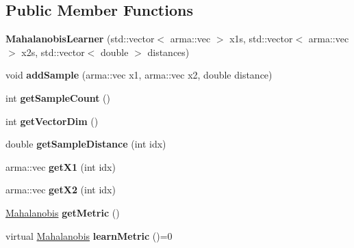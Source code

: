 \subsection*{Public Member Functions}
\begin{DoxyCompactItemize}
\item 
\hypertarget{classkukadu_1_1MahalanobisLearner_a9f9d3dffef0fad99e19e54e4ce99e9d2}{{\bfseries Mahalanobis\-Learner} (std\-::vector$<$ arma\-::vec $>$ x1s, std\-::vector$<$ arma\-::vec $>$ x2s, std\-::vector$<$ double $>$ distances)}\label{classkukadu_1_1MahalanobisLearner_a9f9d3dffef0fad99e19e54e4ce99e9d2}

\item 
\hypertarget{classkukadu_1_1MahalanobisLearner_a4f3b38ac5088b27d34a2bc8200aa8dce}{void {\bfseries add\-Sample} (arma\-::vec x1, arma\-::vec x2, double distance)}\label{classkukadu_1_1MahalanobisLearner_a4f3b38ac5088b27d34a2bc8200aa8dce}

\item 
\hypertarget{classkukadu_1_1MahalanobisLearner_af57c5d3f3876acc201e923a55db342ca}{int {\bfseries get\-Sample\-Count} ()}\label{classkukadu_1_1MahalanobisLearner_af57c5d3f3876acc201e923a55db342ca}

\item 
\hypertarget{classkukadu_1_1MahalanobisLearner_a24d0f7f9e43d297454aa316f80019e15}{int {\bfseries get\-Vector\-Dim} ()}\label{classkukadu_1_1MahalanobisLearner_a24d0f7f9e43d297454aa316f80019e15}

\item 
\hypertarget{classkukadu_1_1MahalanobisLearner_aeb08af8a9bbf6d482a7bbdb1c34e933b}{double {\bfseries get\-Sample\-Distance} (int idx)}\label{classkukadu_1_1MahalanobisLearner_aeb08af8a9bbf6d482a7bbdb1c34e933b}

\item 
\hypertarget{classkukadu_1_1MahalanobisLearner_ac552c824300edabfc56f097f8adfea4a}{arma\-::vec {\bfseries get\-X1} (int idx)}\label{classkukadu_1_1MahalanobisLearner_ac552c824300edabfc56f097f8adfea4a}

\item 
\hypertarget{classkukadu_1_1MahalanobisLearner_a43027e86750acf224b07edbe63514a2b}{arma\-::vec {\bfseries get\-X2} (int idx)}\label{classkukadu_1_1MahalanobisLearner_a43027e86750acf224b07edbe63514a2b}

\item 
\hypertarget{classkukadu_1_1MahalanobisLearner_a66f0a4fbe1aef2a2eb8434552fe6a556}{\hyperlink{classkukadu_1_1Mahalanobis}{Mahalanobis} {\bfseries get\-Metric} ()}\label{classkukadu_1_1MahalanobisLearner_a66f0a4fbe1aef2a2eb8434552fe6a556}

\item 
\hypertarget{classkukadu_1_1MahalanobisLearner_a05b61576c302b5484bc1a482968c01a0}{virtual \hyperlink{classkukadu_1_1Mahalanobis}{Mahalanobis} {\bfseries learn\-Metric} ()=0}\label{classkukadu_1_1MahalanobisLearner_a05b61576c302b5484bc1a482968c01a0}

\end{DoxyCompactItemize}

